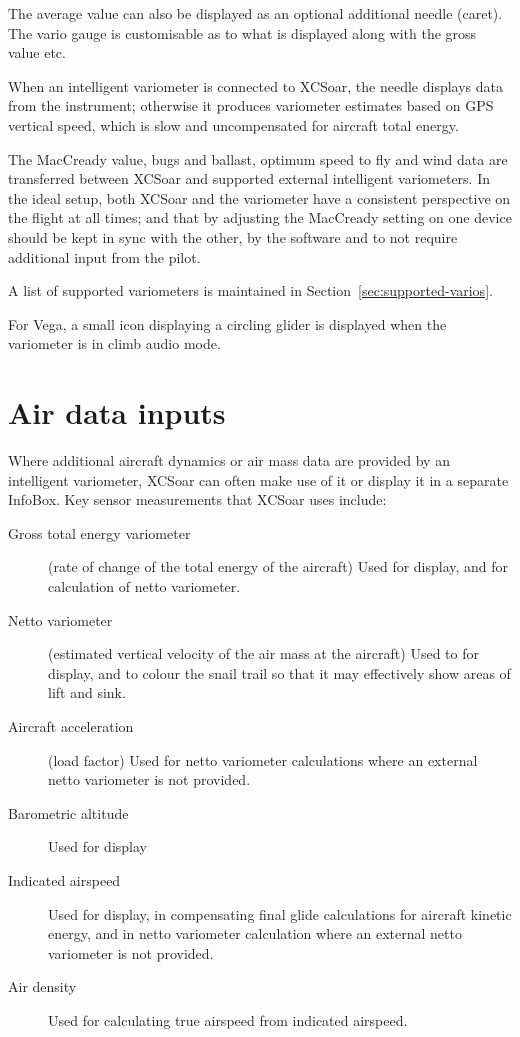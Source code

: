 The average value can also be displayed as an optional additional
needle (caret).
The vario gauge is customisable  as to what is displayed
along with the gross value etc.

When an intelligent variometer is connected to XCSoar, the needle
displays data from the instrument; otherwise it produces variometer
estimates based on GPS vertical speed, which is slow and uncompensated
for aircraft total energy.  

The MacCready value, bugs and ballast, optimum speed to fly and wind
data are transferred between XCSoar and supported external intelligent
variometers.  In the ideal setup, both XCSoar and the variometer have
a consistent perspective on the flight at all times; and that by
adjusting the MacCready setting on one device should be kept in sync
with the other, by the software and to not require additional input from
the pilot.

A list of supported variometers is maintained in
Section~\ref{sec:supported-varios}.

For Vega, a small icon displaying a circling glider is displayed when
the variometer is in climb audio mode.

\section{Air data inputs}

Where additional aircraft dynamics or air mass data are provided by an
intelligent variometer, XCSoar can often make use of it or display it
in a separate InfoBox.  Key sensor measurements that XCSoar uses include:
\begin{description}
\item[Gross total energy variometer] (rate of change of the total energy of
 the aircraft)  Used for display, and for calculation of netto variometer.
\item[Netto variometer] (estimated vertical velocity of the air mass at
 the aircraft)  Used to for display, and to colour the snail trail
 so that it may effectively show areas of lift and sink.
\item[Aircraft acceleration] (load factor)  Used for netto variometer
  calculations where an external netto variometer is not provided.
\item[Barometric altitude] Used for display
\item[Indicated airspeed] Used for display, in compensating final glide
  calculations for aircraft kinetic energy, and in netto variometer
  calculation where an external netto variometer is not provided.
\item[Air density] Used for calculating true airspeed from indicated
  airspeed.
\end{description}


